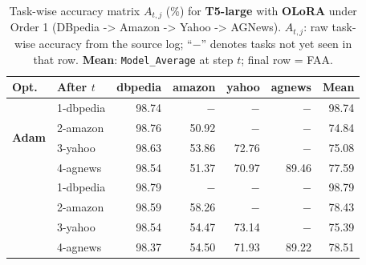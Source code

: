\begin{table}[ht]
\centering
\caption{%
  Task-wise accuracy matrix $A_{t,j}$ (\%) for \textbf{T5-large} with \textbf{OLoRA} under Order 1 (DBpedia -> Amazon -> Yahoo -> AGNews).
  $A_{t,j}$: raw task-wise accuracy from the source log; ``$-$'' denotes tasks not yet seen in that row.
  \textbf{Mean}: \texttt{Model\_Average} at step $t$; final row = FAA.
}
\label{tab:nlp_o1_t5large_olora}
\setlength{\tabcolsep}{4.0pt}
\renewcommand{\arraystretch}{0.92}
\scriptsize
\begin{tabular}{@{}l l r r r r r@{}}
\toprule
\textbf{Opt.} & \textbf{After $t$} & \textbf{dbpedia} & \textbf{amazon} & \textbf{yahoo} & \textbf{agnews} & \textbf{Mean} \\
\midrule
\multirow{4}{*}{\textbf{Adam}} & 1-dbpedia & 98.74 & $-$ & $-$ & $-$ & 98.74 \\
 & 2-amazon & 98.76 & 50.92 & $-$ & $-$ & 74.84 \\
 & 3-yahoo & 98.63 & 53.86 & 72.76 & $-$ & 75.08 \\
 & 4-agnews & 98.54 & 51.37 & 70.97 & 89.46 & 77.59 \\
\addlinespace[2pt]
\multirow{4}{*}{\textbf{SAM}} & 1-dbpedia & 98.79 & $-$ & $-$ & $-$ & 98.79 \\
 & 2-amazon & 98.59 & 58.26 & $-$ & $-$ & 78.43 \\
 & 3-yahoo & 98.54 & 54.47 & 73.14 & $-$ & 75.39 \\
 & 4-agnews & 98.37 & 54.50 & 71.93 & 89.22 & 78.51 \\
\bottomrule
\end{tabular}
\end{table}

